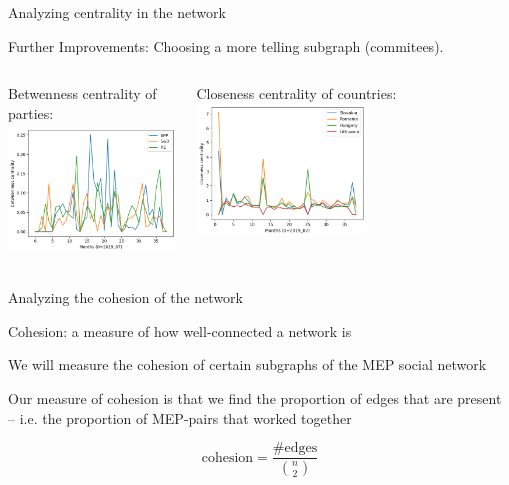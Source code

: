 \documentclass{beamer}
\begin{document}
\begin{frame}{Analyzing centrality in the network}
	
	Further Improvements: Choosing a more telling subgraph (commitees).
	\vspace{4mm}
	\pause
	
	\begin{columns}
	\column{5cm}
	Betwenness centrality of parties:
	\\
	\includegraphics[height=3.5cm]{img/BTW_group_centrality_party_biggest3.png}

	\pause \column{5cm}
	Closeness centrality of countries:
	\includegraphics[height=3.5cm]{img/Closeness_group_centrality_country_close_4.png}

	\end{columns}
	
\end{frame}

\begin{frame}{Analyzing the cohesion of the network}
	
	Cohesion: a measure of how well-connected a network is
	
	\vspace{2mm}
	
	\pause We will measure the cohesion of certain subgraphs of the MEP social network
	
	\vspace{2mm}
	
	\pause Our measure of cohesion is that we find the proportion of edges that are present -- i.e. the proportion of MEP-pairs that worked together
	
	\pause \[
		\text{cohesion} = \frac{\#\text{edges}}{\binom{n}{2}}
	\]
	
\end{frame}
\end{document}
